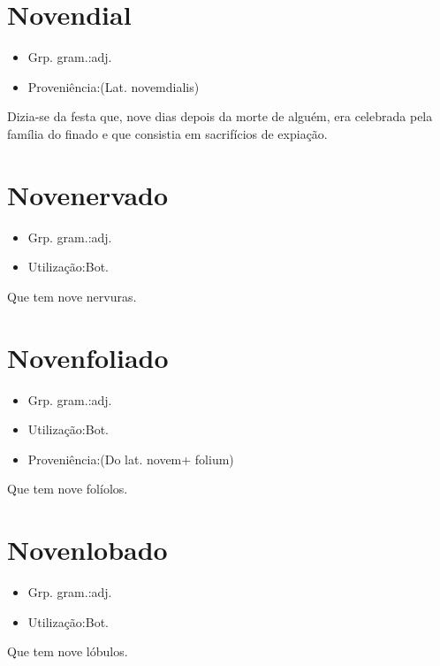 \section{Novendial}
\begin{itemize}
\item {Grp. gram.:adj.}
\end{itemize}
\begin{itemize}
\item {Proveniência:(Lat. \textunderscore novemdialis\textunderscore )}
\end{itemize}
Dizia-se da festa que, nove dias depois da morte de alguém, era celebrada pela família do finado e que consistia em sacrifícios de expiação.
\section{Novenervado}
\begin{itemize}
\item {Grp. gram.:adj.}
\end{itemize}
\begin{itemize}
\item {Utilização:Bot.}
\end{itemize}
Que tem nove nervuras.
\section{Novenfoliado}
\begin{itemize}
\item {Grp. gram.:adj.}
\end{itemize}
\begin{itemize}
\item {Utilização:Bot.}
\end{itemize}
\begin{itemize}
\item {Proveniência:(Do lat. \textunderscore novem\textunderscore  + \textunderscore folium\textunderscore )}
\end{itemize}
Que tem nove folíolos.
\section{Novenlobado}
\begin{itemize}
\item {Grp. gram.:adj.}
\end{itemize}
\begin{itemize}
\item {Utilização:Bot.}
\end{itemize}
Que tem nove lóbulos.
